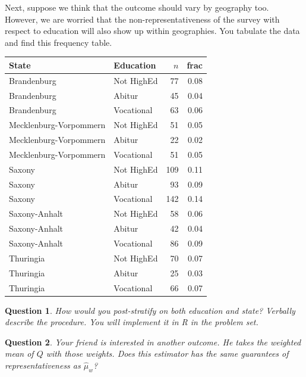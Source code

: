 \documentclass[10pt, letterpaper]{article}
\theoremstyle{mytheoremstyle}
\newtheorem{question}{Question}[section]
\begin{document}
Next, suppose we think that the outcome should vary by geography too. However, we are worried that the non-representativeness of the survey with respect to education will also show up within geographies.  You tabulate the data and find this frequency table. 

\begin{center}
\begin{minipage}{0.5\linewidth}
\singlespacing
\begin{tabular}[t]{llrr}
\toprule
State & Education & $n$ & frac\\
\midrule
Brandenburg & Not HighEd & 77 & 0.08\\
Brandenburg & Abitur & 45 & 0.04\\
Brandenburg & Vocational & 63 & 0.06\\
Mecklenburg-Vorpommern & Not HighEd & 51 & 0.05\\
Mecklenburg-Vorpommern & Abitur & 22 & 0.02\\
Mecklenburg-Vorpommern & Vocational & 51 & 0.05\\
Saxony & Not HighEd & 109 & 0.11\\
Saxony & Abitur & 93 & 0.09\\
Saxony & Vocational & 142 & 0.14\\
Saxony-Anhalt & Not HighEd & 58 & 0.06\\
Saxony-Anhalt & Abitur & 42 & 0.04\\
Saxony-Anhalt & Vocational & 86 & 0.09\\
Thuringia & Not HighEd & 70 & 0.07\\
Thuringia & Abitur & 25 & 0.03\\
Thuringia & Vocational & 66 & 0.07\\
\bottomrule
\end{tabular}
\end{minipage}
\end{center}

\begin{question}\label{ques:jointpost}
How would you post-stratify on both education and state? Verbally describe the procedure. You will implement it in R in the problem set. 
\end{question}

\begin{question}
Your friend is interested in another outcome. He takes the weighted mean of $Q$ with those weights. Does this estimator has the same guarantees of representativeness as $\widehat{\mu}_w$?
\end{question}
\end{document}
